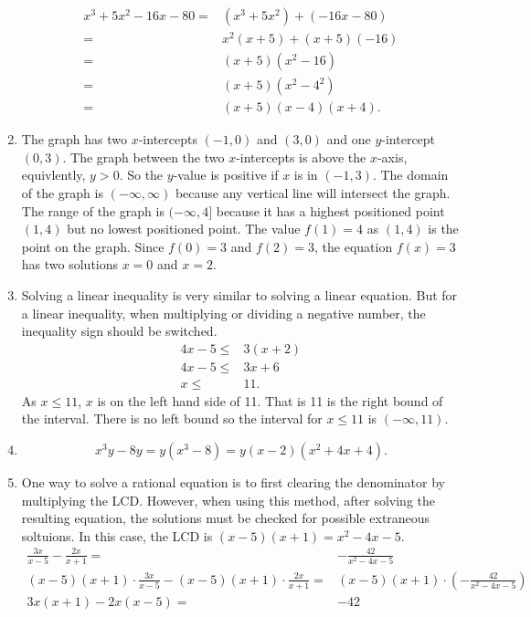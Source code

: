 \documentclass[
  12pt]{article}
\begin{document}
\begin{enumerate}
  \[
   \begin{aligned}
   x^3+5x^2-16x-80=&(x^3+5x^2)+(-16x-80)\\
   =&x^2(x+5)+(x+5)(-16)\\
   =&(x+5)(x^2-16)\\
   =&(x+5)(x^2-4^2)\\
   =&(x+5)(x-4)(x+4).
   \end{aligned}
   \]
\item
  The graph has two \(x\)-intercepts \((-1, 0)\) and \((3,0)\) and one
  \(y\)-intercept \((0, 3)\). The graph between the two \(x\)-intercepts
  is above the \(x\)-axis, equivlently, \(y>0\). So the \(y\)-value is
  positive if \(x\) is in \((-1,3)\). The domain of the graph is
  \((-\infty, \infty)\) because any vertical line will intersect the
  graph. The range of the graph is \((-\infty, 4]\) because it has a
  highest positioned point \((1, 4)\) but no lowest positioned point.
  The value \(f(1)=4\) as \((1, 4)\) is the point on the graph. Since
  \(f(0)=3\) and \(f(2)=3\), the equation \(f(x)=3\) has two solutions
  \(x=0\) and \(x=2\).
\item
  Solving a linear inequality is very similar to solving a linear
  equation. But for a linear inequality, when multiplying or dividing a
  negative number, the inequality sign should be switched. \[
   \begin{aligned}
   4x-5\leq& 3(x+2)\\
   4x-5\leq& 3x+6\\
   x\leq&11.
   \end{aligned}
   \] As \(x\leq 11\), \(x\) is on the left hand side of 11. That is 11
  is the right bound of the interval. There is no left bound so the
  interval for \(x\le 11\) is \((-\infty, 11)\).
\item
  \[x^3y-8y=y(x^3-8)=y(x-2)(x^2+4x+4).\]
\item
  One way to solve a rational equation is to first clearing the
  denominator by multiplying the LCD. However, when using this method,
  after solving the resulting equation, the solutions must be checked
  for possible extraneous soltuions. In this case, the LCD is
  \((x-5)(x+1)=x^2-4x-5\). \[
   \begin{aligned}
   \frac{3x}{x-5}-\frac{2x}{x+1}=&-\frac{42}{x^2-4x-5}\\
   (x-5)(x+1)\cdot\frac{3x}{x-5}-(x-5)(x+1)\cdot\frac{2x}{x+1}=&(x-5)(x+1)\cdot\left(-\frac{42}{x^2-4x-5}\right)\\
   3x(x+1)-2x(x-5)=&-42\\

\end{aligned}\]
\end{enumerate}
\end{document}
